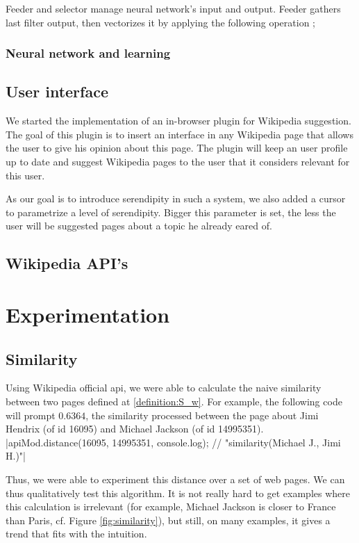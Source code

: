 \documentclass[11pt]{article}
\theoremstyle{plain}
\theoremstyle{definition}
\theoremstyle{remark}
\begin{document}
Feeder and selector manage neural network's input and output. Feeder gathers last filter output, then vectorizes it by applying the following operation ; 

\subsubsection{Neural network and learning}

\subsection{User interface}
We started the implementation of an in-browser plugin for Wikipedia suggestion.
The goal of this plugin is to insert an interface in any Wikipedia page that allows the user to give his opinion about this page. The plugin will keep an user profile up to date and suggest Wikipedia pages to the user that it considers relevant for this user.

As our goal is to introduce serendipity in such a system, we also added a cursor to parametrize a level of serendipity. Bigger this parameter is set, the less the user will be suggested pages about a topic he already eared of.

\subsection{Wikipedia API's}


\section{Experimentation}
\subsection{Similarity}
Using Wikipedia official api, we were able to calculate the naive similarity between two pages defined at \ref{definition:S_w}. For example, the following code will prompt $0.6364$, the similarity processed between the page about Jimi Hendrix (of id 16095) and Michael Jackson (of id 14995351).
  |apiMod.distance(16095, 14995351, console.log); // "similarity(Michael J.,  Jimi H.)"|
  
Thus, we were able to experiment this distance over a set of web pages. We can thus qualitatively test this algorithm. It is not really hard to get examples where this calculation is irrelevant (for example, Michael Jackson is closer to France than Paris, cf. Figure \ref{fig:similarity}), but still, on many examples, it gives a trend that fits with the intuition.
\end{document}
